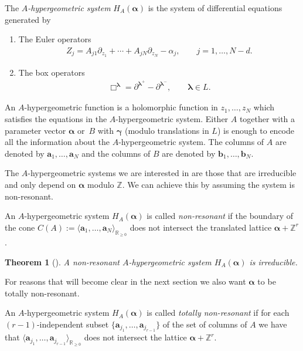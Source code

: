 \documentclass[11pt]{article}
\numberwithin{equation}{section}
\numberwithin{equation}{section}
\newtheorem{Theorem}{Theorem}[section]
\begin{document}
{\samepage
The {\it $A$-hypergeometric system} $H_{A}(\bm{\alpha})$ is the system of differential equations generated by
\begin{enumerate}\itemsep=0pt
\item The Euler operators
\begin{gather*}%
Z_j=A_{j1}\partial_{z_1}+\cdots+A_{jN}\partial_{z_N}-\alpha_j,\qquad j=1,\dots,N-d.
\end{gather*}
\item The box operators
\begin{gather*}%
\Box^{\bm{\lambda}}=\partial^{\bm{\lambda}^+}-\partial^{\bm{\lambda}^-},\qquad
\bm{\lambda}\in L.
\end{gather*}
\end{enumerate}}

An $A$-hypergeometric function is a holomorphic
function in $z_1,\dots,z_N$ which satisfies the equations in the $A$-hypergeometric system. Either $A$ together with a parameter vector $\bm{\alpha}$ or~$B$
with $\bm{\gamma}$ (modulo translations in $L$) is enough to encode all the information about the $A$-hypergeometric system. The columns of $A$ are denoted by $\bm{a}_1,\dots,\bm{a}_N$ and the columns of $B$ are denoted by $\bm{b}_1,\dots,\bm{b}_N$.

\setcounter{Theorem}{1}
The $A$-hypergeometric systems we are interested in are those that are irreducible and only depend on $\bm{\alpha}$ modulo $\mathbb{Z}$. We can achieve this by assuming the system is non-resonant.

\begin{Definition}
An $A$-hypergeometric system $H_{A}(\bm{\alpha})$ is called {\it non-resonant} if the boundary of the cone $C(A) := \langle \bm{a}_1, \dots,\bm{a}_N \rangle_{\mathbb{R}_{\geq 0}}$ does not intersect the translated lattice $\bm{\alpha} + \mathbb{Z}^r$.
\end{Definition}

\begin{Theorem}[{\cite[Theorem 2.11]{GKZ90}}]
A non-resonant {$A$-hypergeometric} system $H_A(\bm\alpha)$ is irreducible.
\end{Theorem}

For reasons that will become clear in the next section we also want $\bm{\alpha}$ to be totally non-resonant.

\begin{Definition}\label{def:total-nonres}\sloppy
An $A$-hypergeometric system $H_{A}(\bm{\alpha})$ is called {\it totally non-resonant} if for each \mbox{$(r-1)$}-independent subset $\{\bm{a}_{j_1},\dots,\bm{a}_{j_{r-1}}\}$ of the set of columns of $A$ we have that $\langle \bm{a}_{j_1}, \dots,\bm{a}_{j_{r-1}} \rangle_{\mathbb{R}_{\geq 0}}$ does not intersect the lattice $\bm{\alpha} + \mathbb{Z}^r$.
\end{Definition}
\end{document}
